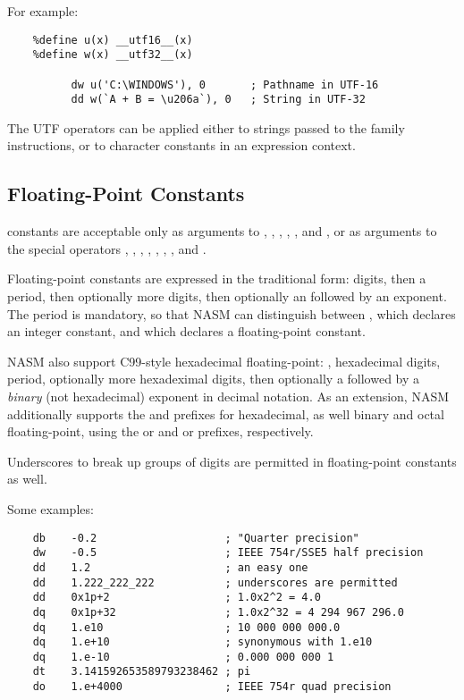 For example:

\begin{lstlisting}
	%define u(x) __utf16__(x)
	%define w(x) __utf32__(x)

	      dw u('C:\WINDOWS'), 0       ; Pathname in UTF-16
	      dd w(`A + B = \u206a`), 0   ; String in UTF-32
\end{lstlisting}

The UTF operators can be applied either to strings passed to the
 family instructions, or to character constants in an expression
context.

\subsection{Floating-Point Constants}
\label{subsec:fltconst}

 constants are acceptable only as arguments to
, , , , ,
and , or as arguments to the special operators ,
, , ,
, , ,
and .

Floating-point constants are expressed in the traditional form:
digits, then a period, then optionally more digits, then optionally an
 followed by an exponent. The period is mandatory, so that NASM
can distinguish between , which declares an integer constant,
and  which declares a floating-point constant.

NASM also support C99-style hexadecimal floating-point: ,
hexadecimal digits, period, optionally more hexadeximal digits, then
optionally a  followed by a \emph{binary} (not hexadecimal)
exponent in decimal notation. As an extension, NASM additionally
supports the  and \code{\$} prefixes for hexadecimal,
as well binary and octal floating-point, using the  or
 and  or  prefixes, respectively.

Underscores to break up groups of digits are permitted in
floating-point constants as well.

Some examples:

\begin{lstlisting}
	db    -0.2                    ; "Quarter precision"
	dw    -0.5                    ; IEEE 754r/SSE5 half precision
	dd    1.2                     ; an easy one
	dd    1.222_222_222           ; underscores are permitted
	dd    0x1p+2                  ; 1.0x2^2 = 4.0
	dq    0x1p+32                 ; 1.0x2^32 = 4 294 967 296.0
	dq    1.e10                   ; 10 000 000 000.0
	dq    1.e+10                  ; synonymous with 1.e10
	dq    1.e-10                  ; 0.000 000 000 1
	dt    3.141592653589793238462 ; pi
	do    1.e+4000                ; IEEE 754r quad precision
\end{lstlisting}

